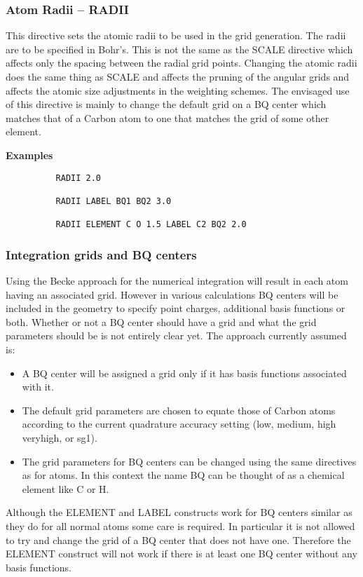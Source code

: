 \documentclass[11pt,fleqn]{article}
\begin{document}
\subsubsection{Atom Radii -- RADII}

This directive sets the atomic radii to be used in the grid generation. 
The radii are to be specified in Bohr's.
This is not the same as the SCALE directive which affects only the spacing
between the radial grid points. Changing the atomic radii does the same thing
as SCALE and affects the pruning of the angular grids and affects the atomic
size adjustments in the weighting schemes. The envisaged use of this directive
is mainly to change the default grid on a BQ center which matches that of a 
Carbon atom to one that matches the grid of some other element.

{\bf Examples}

{
\footnotesize
\begin{verbatim}
          RADII 2.0

          RADII LABEL BQ1 BQ2 3.0

          RADII ELEMENT C O 1.5 LABEL C2 BQ2 2.0
\end{verbatim}
}


\subsubsection{Integration grids and BQ centers}

Using the Becke approach for the numerical integration will result
in each atom having an associated grid. However in various calculations
BQ centers will be included in the geometry to specify point charges, 
additional basis functions or both. Whether or not a BQ center should have a 
grid and what the grid parameters should be is not entirely clear yet. 
The approach currently assumed is:
\begin{itemize}
\item A BQ center will be assigned a grid only if it has basis functions
      associated with it. 
\item The default grid parameters are chosen to equate those of Carbon atoms
      according to the current quadrature accuracy setting (low, medium, high
      veryhigh, or sg1).
\item The grid parameters for BQ centers can be changed using the same
      directives as for atoms. In this context the name BQ can be thought of
      as a chemical element like C or H.
\end{itemize}
Although the ELEMENT and LABEL constructs work for BQ centers similar as they 
do for all normal atoms some care is required. In particular it is not allowed
to try and change the grid of a BQ center that does not have one. Therefore
the ELEMENT construct will not work if there is at least one BQ center without
any basis functions.
\end{document}
